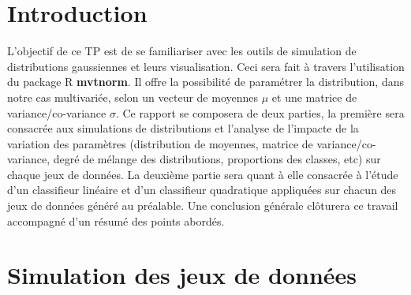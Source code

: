 \section{Introduction}
L'objectif de ce TP	est de se familiariser avec les outils de simulation de distributions gaussiennes et leurs visualisation. Ceci sera fait à travers l'utilisation du package R \textbf{mvtnorm}. Il offre la possibilité de paramétrer la distribution, dans notre cas multivariée, selon un vecteur de moyennes $\mu$ et une matrice de variance/co-variance $\sigma$. Ce rapport se composera de deux parties, la première sera consacrée aux simulations de distributions et l'analyse de l'impacte de la variation des paramètres (distribution de moyennes, matrice de variance/co-variance, degré de mélange des distributions, proportions des classes, etc) sur chaque jeux de données. La deuxième partie sera quant à elle consacrée à l'étude d'un classifieur linéaire et d'un classifieur quadratique appliquées sur chacun des jeux de données généré au préalable. Une conclusion générale clôturera ce travail accompagné d'un résumé des points abordés.


\section{Simulation des jeux de données}
